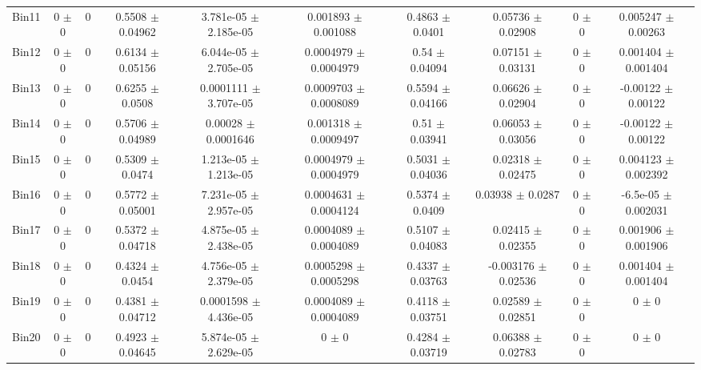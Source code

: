 \begin{tabular}{@{\extracolsep{4pt}}lccccccccc@{}}
     Bin11 & 0 $\pm$ 0 & 0 & 0.5508 $\pm$ 0.04962 & 3.781e-05 $\pm$ 2.185e-05 & 0.001893 $\pm$ 0.001088 & 0.4863 $\pm$ 0.0401 & 0.05736 $\pm$ 0.02908 & 0 $\pm$ 0 & 0.005247 $\pm$ 0.00263 \\ 
     Bin12 & 0 $\pm$ 0 & 0 & 0.6134 $\pm$ 0.05156 & 6.044e-05 $\pm$ 2.705e-05 & 0.0004979 $\pm$ 0.0004979 & 0.54 $\pm$ 0.04094 & 0.07151 $\pm$ 0.03131 & 0 $\pm$ 0 & 0.001404 $\pm$ 0.001404 \\ 
     Bin13 & 0 $\pm$ 0 & 0 & 0.6255 $\pm$ 0.0508 & 0.0001111 $\pm$ 3.707e-05 & 0.0009703 $\pm$ 0.0008089 & 0.5594 $\pm$ 0.04166 & 0.06626 $\pm$ 0.02904 & 0 $\pm$ 0 & -0.00122 $\pm$ 0.00122 \\ 
     Bin14 & 0 $\pm$ 0 & 0 & 0.5706 $\pm$ 0.04989 & 0.00028 $\pm$ 0.0001646 & 0.001318 $\pm$ 0.0009497 & 0.51 $\pm$ 0.03941 & 0.06053 $\pm$ 0.03056 & 0 $\pm$ 0 & -0.00122 $\pm$ 0.00122 \\ 
     Bin15 & 0 $\pm$ 0 & 0 & 0.5309 $\pm$ 0.0474 & 1.213e-05 $\pm$ 1.213e-05 & 0.0004979 $\pm$ 0.0004979 & 0.5031 $\pm$ 0.04036 & 0.02318 $\pm$ 0.02475 & 0 $\pm$ 0 & 0.004123 $\pm$ 0.002392 \\ 
     Bin16 & 0 $\pm$ 0 & 0 & 0.5772 $\pm$ 0.05001 & 7.231e-05 $\pm$ 2.957e-05 & 0.0004631 $\pm$ 0.0004124 & 0.5374 $\pm$ 0.0409 & 0.03938 $\pm$ 0.0287 & 0 $\pm$ 0 & -6.5e-05 $\pm$ 0.002031 \\ 
     Bin17 & 0 $\pm$ 0 & 0 & 0.5372 $\pm$ 0.04718 & 4.875e-05 $\pm$ 2.438e-05 & 0.0004089 $\pm$ 0.0004089 & 0.5107 $\pm$ 0.04083 & 0.02415 $\pm$ 0.02355 & 0 $\pm$ 0 & 0.001906 $\pm$ 0.001906 \\ 
     Bin18 & 0 $\pm$ 0 & 0 & 0.4324 $\pm$ 0.0454 & 4.756e-05 $\pm$ 2.379e-05 & 0.0005298 $\pm$ 0.0005298 & 0.4337 $\pm$ 0.03763 & -0.003176 $\pm$ 0.02536 & 0 $\pm$ 0 & 0.001404 $\pm$ 0.001404 \\ 
     Bin19 & 0 $\pm$ 0 & 0 & 0.4381 $\pm$ 0.04712 & 0.0001598 $\pm$ 4.436e-05 & 0.0004089 $\pm$ 0.0004089 & 0.4118 $\pm$ 0.03751 & 0.02589 $\pm$ 0.02851 & 0 $\pm$ 0 & 0 $\pm$ 0 \\ 
     Bin20 & 0 $\pm$ 0 & 0 & 0.4923 $\pm$ 0.04645 & 5.874e-05 $\pm$ 2.629e-05 & 0 $\pm$ 0 & 0.4284 $\pm$ 0.03719 & 0.06388 $\pm$ 0.02783 & 0 $\pm$ 0 & 0 $\pm$ 0 \\ 
\hline\hline
  \end{tabular}

